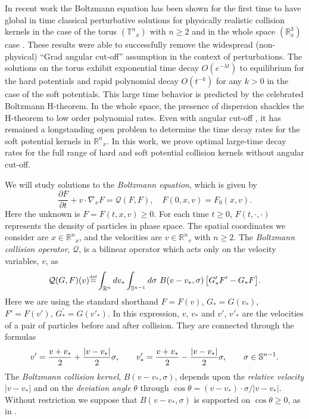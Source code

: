 \documentclass{amsart}
\numberwithin{equation}{section}
\begin{document}
In recent work the Boltzmann equation has been shown for the first time to have global in time classical perturbative solutions for physically realistic collision kernels in the case of the torus $({\mathbb{T}^{n}}_x)$ \cite{gsNonCutA,gsNonCut0} with ${n} \ge 2$ and in the whole space $({\mathbb{R}}^3_x)$ case \cite{MR2847536}.  These results were able to successfully remove the  widespread (non-physical) ``Grad angular cut-off'' assumption in the context of perturbations.  The solutions on the torus exhibit exponential time decay $O(e^{-{\lambda} t})$ to equilibrium for the hard potentials and rapid polynomial decay  $O( t^{-k})$ for any $k>0$ in the case of the soft potentials.  This large time behavior is predicted by the celebrated Boltzmann H-theorem.  In the whole space, the presence of dispersion shackles the H-theorem to low order polynomial rates.  Even with angular cut-off \cite{MR677262}, it has remained a longstanding open problem to determine the  time decay rates for the soft potential kernels in ${{\mathbb R}^{n}}_x$.  In this work, we prove optimal large-time decay rates for the full range of hard and soft potential collision kernels without angular cut-off.

We will study solutions to the {\em Boltzmann equation}, which is given by
  \begin{equation}
  \frac{\partial F}{\partial t} + v \cdot \nabla_x F = {\mathcal Q}(F,F),
  \quad
  F(0,x,{v}) = F_0(x,{v}).
  \label{BoltzFULL}
  \end{equation}
Here the unknown is $F=F(t,x,v)\ge 0$.  For each time $t\ge 0$, $F(t, \cdot, \cdot)$ represents the density of particles in phase space. The spatial coordinates we consider  are $x\in{{\mathbb R}^{n}}_x$, and the velocities are ${v}\in{{\mathbb R}^{n}}_v$ with 
${n} \ge 2$.   The  {\em Boltzmann collision operator}, ${\mathcal Q}$,
is a bilinear operator which acts only on the velocity variables, ${v}$, as 
  \begin{equation*}
  {\mathcal Q} (G,F)(v) {\overset{\mbox{\tiny{def}}}{=}} 
  \int_{\mathbb{R}^n}  dv_* 
  \int_{\mathbb{S}^{n-1}}  d\sigma~ 
  B(v-v_*, \sigma) \, 
  \big[ G'_* F' - G_* F \big].
  \end{equation*} 
Here we are using the standard shorthand $F = F(v)$, $G_* = G(v_*)$, $F' = F(v')$, $G_*^{\prime} = G(v'_*)$. 
In this expression,  $v$, $v_*$ and $v'$, $v' _*$  are 
the velocities of a pair of particles before and after collision.  They are connected through the formulas
  \begin{equation}
  v' = \frac{v+v_*}{2} + \frac{|v-v_*|}{2} \sigma, \qquad
  v'_* = \frac{v+v_*}{2} - \frac{|v-v_*|}{2} \sigma,
  \qquad \sigma \in \mathbb{S}^{n-1}.
\notag 
  \end{equation}
The {\em Boltzmann collision kernel}, $B(v-v_*, \sigma)$, depends upon the {\em relative velocity} $|v-v_*|$ and on
the {\em deviation angle}  $\theta$ through 
$\cos \theta = ( v-v_* )\cdot \sigma/|v-v_*|$.  Without restriction we suppose that  $B(v-v_*, \sigma)$
is supported on $\cos \theta \ge 0$, as in \cite{MR1379589,gsNonCut0}.
\end{document}
